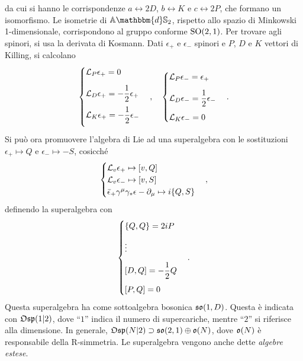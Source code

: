 da cui si hanno le corrispondenze $a \leftrightarrow 2D$, $b \leftrightarrow K$ e $c \leftrightarrow 2P$, che formano un isomorfismo. Le isometrie di $\bb{A}\mathbbm{d}\bb{S}_2$, rispetto allo spazio di Minkowski 1-dimensionale, corrispondono al gruppo conforme $\mathrm{SO}(2,1)$. Per trovare agli spinori, si usa la derivata di Kosmann. Dati $\epsilon_+$ e $\epsilon_-$ spinori e $P$, $D$ e $K$ vettori di Killing, si calcolano 
\begin{equation}
    \begin{cases}
        \mathcal{L}_P\epsilon_+ = 0 \\[2ex]
        \mathcal{L}_D\epsilon_+ = -\dfrac{1}{2}\epsilon_+ \\[2ex]
        \mathcal{L}_K\epsilon_+ = -\dfrac{1}{2}\epsilon_- \\[2ex]
    \end{cases},\quad
    \begin{cases}
        \mathcal{L}_P\epsilon_- = \epsilon_+ \\[2ex]
        \mathcal{L}_D\epsilon_- = \dfrac{1}{2}\epsilon_- \\[2ex]
        \mathcal{L}_K\epsilon_- = 0
    \end{cases}.
\end{equation}
Si può ora promuovere l'algebra di Lie ad una superalgebra con le sostituzioni $\epsilon_+ \mapsto Q$ e $\epsilon_- \mapsto -S$, cosicché
\begin{equation}
    \begin{cases}
        \mathcal{L}_v\epsilon_+ \mapsto [v,Q] \\
        \mathcal{L}_v\epsilon_- \mapsto [v,S] \\
        \bar{\epsilon}_+\gamma^\mu\gamma_*\epsilon-\partial_\mu \mapsto i\{Q,S\}
    \end{cases},
\end{equation}
definendo la superalgebra con
\begin{equation}
    \begin{cases}
        \{Q,Q\} = 2iP \\[2ex]
        \vdots \\[2ex]
        [D,Q] = -\dfrac{1}{2}Q \\[2ex]
        [P,Q] = 0
    \end{cases}.
\end{equation}
Questa superalgebra ha come sottoalgebra bosonica $\mathfrak{so}(1,D)$. Questa è indicata con $\mathfrak{Osp}(1|2)$, dove ``$1$'' indica il numero di supercariche, mentre ``$2$'' si riferisce alla dimensione. In generale, $\mathfrak{Osp}(N|2) \supset \mathfrak{so}(2,1) \oplus \mathfrak{o}(N)$, dove $\mathfrak{o}(N)$ è responsabile della R-simmetria. Le superalgebra vengono anche dette \emph{algebre estese}.

